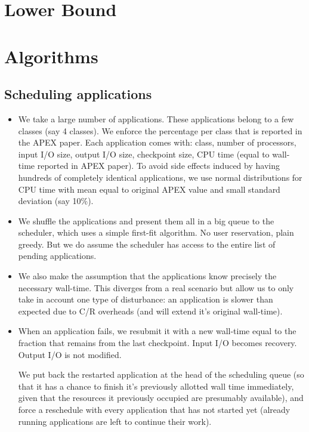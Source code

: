 \documentclass[conference]{IEEEtran}
\begin{document}
\section{Lower Bound}\label{sec:lowerbound}

\section{Algorithms}\label{sec:algorithms}

\subsection{Scheduling applications}

\begin{itemize}
  \item We take a large number of applications. These applications belong to a few classes
  (say 4 classes). We enforce the percentage per class that is reported in the APEX paper.
  Each application comes with: class, number of processors, input I/O size, output I/O size,
  checkpoint size,  CPU time (equal to wall-time reported in APEX paper). To avoid side effects
  induced by having hundreds
  of completely identical applications,
  we use normal distributions for CPU time with mean equal to original APEX value and small standard deviation (say 10\%).
  \item We shuffle the applications and present them all in a big queue to the scheduler,
  which uses a simple first-fit algorithm. No user reservation, plain greedy. But we do assume the scheduler has access to the entire list of pending applications.
\item We also make the assumption that the applications know precisely
  the necessary wall-time. This diverges from a real scenario but
  allow us to only take in account one type of disturbance: an
  application is slower than expected due to C/R overheads (and will
  extend it's original wall-time).
  \item When an application fails, we resubmit it with a new wall-time equal to the fraction that remains from the last checkpoint.  Input I/O becomes recovery. Output I/O is not modified.

We put back the restarted application at the head of the scheduling queue
  (so that it has a chance to finish it's previously allotted wall time
  immediately, given that the resources it previously occupied are
  presumably available), and force a reschedule with every application that
  has not started yet (already running applications are left to continue
  their work).
\end{itemize}
\end{document}
